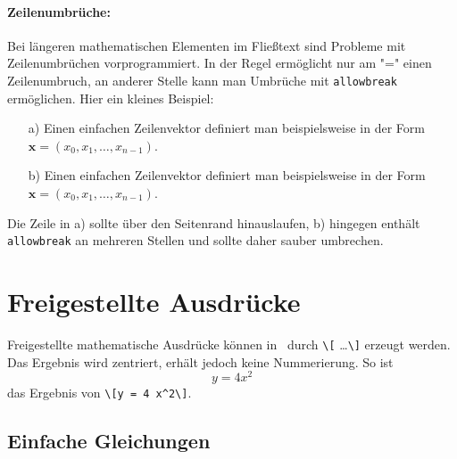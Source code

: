 \paragraph{Zeilenumbrüche:}
Bei längeren mathematischen Elementen im Fließtext sind Probleme mit
Zeilenumbrüchen vorprogrammiert. In der Regel ermöglicht \latex nur am "="
einen Zeilenumbruch, an anderer Stelle kann man Umbrüche mit
\texttt{{\bs}allowbreak} ermöglichen. Hier ein kleines Beispiel:
%
\begin{itemize}
	\item[a)] Einen einfachen Zeilenvektor definiert man beispielsweise in der
	Form $\boldsymbol{x} = (x_0, x_1, \ldots, x_{n-1})$.
	\item[b)] Einen einfachen Zeilenvektor definiert man beispielsweise in der
	Form $\boldsymbol{x} = (x_0,\allowbreak x_1,\allowbreak\ldots,\allowbreak
	x_{n-1})$.
\end{itemize}
%
Die Zeile in a) sollte über den Seitenrand hinauslaufen, b) hingegen enthält
\texttt{{\bs}allowbreak} an mehreren Stellen und sollte daher sauber umbrechen.


\section{Freigestellte Ausdrücke}

Freigestellte mathematische Ausdrücke können in \latex\ durch \verb!\[!
\ldots \verb!\]! erzeugt werden. Das Ergebnis wird zentriert, erhält jedoch
keine Nummerierung. So ist \zB\ \[y = 4 x^2\] das Ergebnis von
\verb!\[y = 4 x^2\]!.


\subsection{Einfache Gleichungen}

